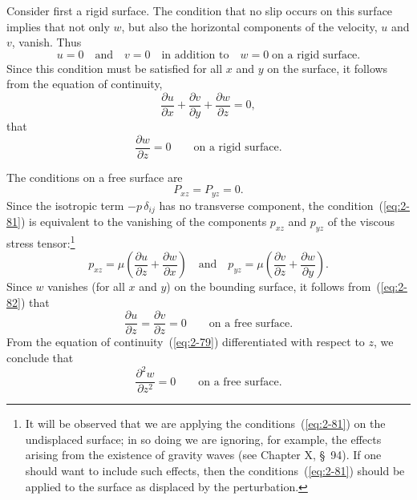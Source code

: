 Consider first a rigid surface. The condition that no slip occurs on
this surface implies that not only $w$, but also the horizontal components
of the velocity, $u$ and $v$, vanish. Thus
\begin{equation}
\label{eq:2-78}
u = 0 \quad\text{and}\quad v = 0 \quad\text{in addition to}\quad w = 0 \;\text{on a rigid surface.}
\end{equation}
Since this condition must be satisfied for all $x$ and $y$ on the surface, it
follows from the equation of continuity,
\begin{equation}
\label{eq:2-79}
\frac{\partial u}{\partial x} + \frac{\partial v}{\partial y} + \frac{\partial w}{\partial z} = 0,
\end{equation}
that
\begin{equation}
\label{eq:2-80}
\frac{\partial w}{\partial z} = 0 \qquad\text{on a rigid surface.}
\end{equation}

The conditions on a free surface are
\begin{equation}
\label{eq:2-81}
P_{xz} = P_{yz} = 0.
\end{equation}
Since the isotropic term $-p\,\delta_{ij}$ has no transverse component, the condition~(\ref{eq:2-81}) is equivalent to the vanishing of the components $p_{xz}$ and $p_{yz}$ of
the viscous stress tensor:\footnote{It will be observed that we are applying the conditions~(\ref{eq:2-81}) on the undisplaced surface; in so doing we are ignoring, for example, the effects arising from the existence of gravity waves (see Chapter X, \S~94). If one should want to include such effects, then the conditions~(\ref{eq:2-81}) should be applied to the surface as displaced by the perturbation.}
\begin{equation}
\label{eq:2-82}
p_{xz} = \mu\!\left(\frac{\partial u}{\partial z}+\frac{\partial w}{\partial x}\right) \quad\text{and}\quad p_{yz} = \mu\!\left(\frac{\partial v}{\partial z}+\frac{\partial w}{\partial y}\right)\!.
\end{equation}
Since $w$ vanishes (for all $x$ and $y$) on the bounding surface, it follows from~(\ref{eq:2-82}) that
\begin{equation}
\label{eq:2-83}
\frac{\partial u}{\partial z} = \frac{\partial v}{\partial z} = 0 \qquad\text{on a free surface.}
\end{equation}
From the equation of continuity~(\ref{eq:2-79}) differentiated with respect to $z$,
we conclude that
\begin{equation}
\label{eq:2-84}
\frac{\partial^2 w}{\partial z^2} = 0 \qquad\text{on a free surface.}
\end{equation}

